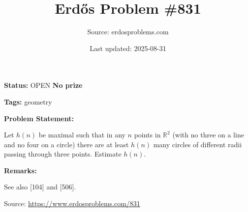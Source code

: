 \documentclass{article}
\title{Erd\H{o}s Problem \#831}
\date{Last updated: 2025-08-31}
\author{Source: erdosproblems.com}
\begin{document}
\maketitle

\noindent\textbf{Status:} OPEN \quad \textbf{No prize}

\noindent\textbf{Tags:} geometry

\medskip
\noindent\textbf{Problem Statement:}

Let $h(n)$ be maximal such that in any $n$ points in $\mathbb{R}^2$ (with no three on a line and no four on a circle) there are at least $h(n)$ many circles of different radii passing through three points. Estimate $h(n)$.

\bigskip
\noindent\textbf{Remarks:}

See also [104] and [506].

\bigskip
\noindent\small{Source: \url{https://www.erdosproblems.com/831}}
\end{document}
